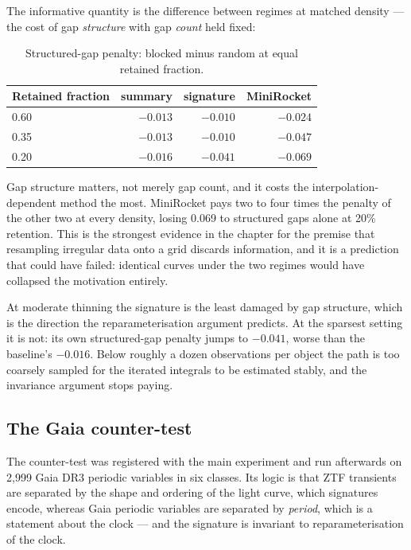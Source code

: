 \documentclass[11pt,a4paper]{report}
\begin{document}
The informative quantity is the difference between regimes at matched density --- the cost
of gap \emph{structure} with gap \emph{count} held fixed:

\begin{table}[h]
\centering
\small
\begin{tabular}{lrrr}
\toprule
Retained fraction & summary & signature & MiniRocket \\
\midrule
0.60 & $-0.013$ & $\mathbf{-0.010}$ & $-0.024$ \\
0.35 & $-0.013$ & $\mathbf{-0.010}$ & $-0.047$ \\
0.20 & $\mathbf{-0.016}$ & $-0.041$ & $-0.069$ \\
\bottomrule
\end{tabular}
\caption{Structured-gap penalty: blocked minus random at equal retained fraction.}
\end{table}

Gap structure matters, not merely gap count, and it costs the interpolation-dependent
method the most. MiniRocket pays two to four times the penalty of the other two at every
density, losing 0.069 to structured gaps alone at 20\% retention. This is the strongest
evidence in the chapter for the premise that resampling irregular data onto a grid discards
information, and it is a prediction that could have failed: identical curves under the two
regimes would have collapsed the motivation entirely.

At moderate thinning the signature is the least damaged by gap structure, which is the
direction the reparameterisation argument predicts. At the sparsest setting it is not: its
own structured-gap penalty jumps to $-0.041$, worse than the baseline's $-0.016$. Below
roughly a dozen observations per object the path is too coarsely sampled for the iterated
integrals to be estimated stably, and the invariance argument stops paying.

\subsection{The Gaia counter-test}

The counter-test was registered with the main experiment and run afterwards on 2{,}999 Gaia
DR3 periodic variables in six classes. Its logic is that ZTF transients are separated by the
shape and ordering of the light curve, which signatures encode, whereas Gaia periodic
variables are separated by \emph{period}, which is a statement about the clock --- and the
signature is invariant to reparameterisation of the clock.
\end{document}
